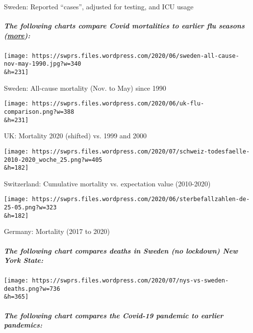 Sweden: Reported ``cases'', adjusted for testing, and ICU usage

\hypertarget{the-following-charts-compare-covid-mortalities-to-earlier-flu-seasons-more}{%
\subparagraph{\texorpdfstring{The following charts compare Covid
mortalities to earlier flu seasons
(\href{https://swprs.org/studies-on-covid-19-lethality/\#overall-mortality}{more}):}{The following charts compare Covid mortalities to earlier flu seasons (more):}}\label{the-following-charts-compare-covid-mortalities-to-earlier-flu-seasons-more}}

\href{https://swprs.files.wordpress.com/2020/06/sweden-all-cause-nov-may-1990.jpg}{}

\texttt{[image: https://swprs.files.wordpress.com/2020/06/sweden-all-cause-nov-may-1990.jpg?w=340\\\&h=231]}

Sweden: All-cause mortality (Nov. to May) since 1990

\href{https://swprs.files.wordpress.com/2020/06/uk-flu-comparison.png}{}

\texttt{[image: https://swprs.files.wordpress.com/2020/06/uk-flu-comparison.png?w=388\\\&h=231]}

UK: Mortality 2020 (shifted) vs. 1999 and 2000

\href{https://swprs.files.wordpress.com/2020/07/schweiz-todesfaelle-2010-2020_woche_25.png}{}

\texttt{[image: https://swprs.files.wordpress.com/2020/07/schweiz-todesfaelle-2010-2020\_woche\_25.png?w=405\\\&h=182]}

Switzerland: Cumulative mortality vs. expectation value (2010-2020)

\href{https://swprs.files.wordpress.com/2020/06/sterbefallzahlen-de-25-05.png}{}

\texttt{[image: https://swprs.files.wordpress.com/2020/06/sterbefallzahlen-de-25-05.png?w=323\\\&h=182]}

Germany: Mortality (2017 to 2020)

\hypertarget{the-following-chart-compares-deaths-in-sweden-no-lockdown-new-york-state}{%
\subparagraph{The following chart compares deaths in Sweden (no
lockdown) New York
State:}\label{the-following-chart-compares-deaths-in-sweden-no-lockdown-new-york-state}}

\texttt{[image: https://swprs.files.wordpress.com/2020/07/nys-vs-sweden-deaths.png?w=736\\\&h=365]}

\hypertarget{the-following-chart-compares-the-covid-19-pandemic-to-earlier-pandemics}{%
\subparagraph{The following chart compares the Covid-19 pandemic to
earlier
pandemics:}\label{the-following-chart-compares-the-covid-19-pandemic-to-earlier-pandemics}}

